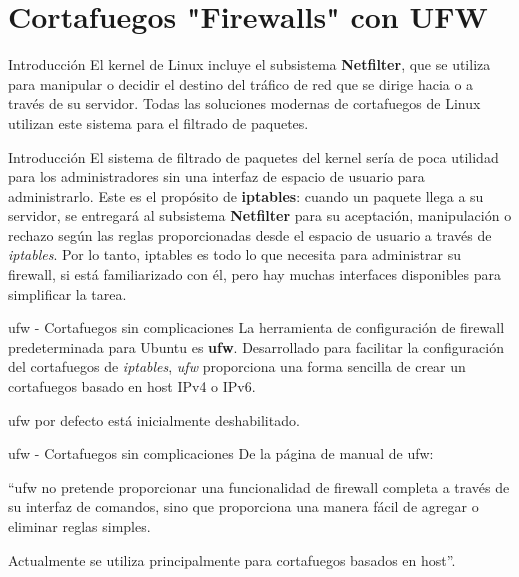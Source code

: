 
\section{Cortafuegos "Firewalls" con UFW}

\begin{frame}[c]{Introducción}
  El kernel de Linux incluye el subsistema \textbf{Netfilter}, que se
  utiliza para manipular o decidir el destino del tráfico de red que se
  dirige hacia o a través de su servidor. Todas las soluciones modernas
  de cortafuegos de Linux utilizan este sistema para el filtrado de paquetes.
\end{frame}

\begin{frame}[c]{Introducción}
  El sistema de filtrado de paquetes del kernel sería de poca utilidad para
  los administradores sin una interfaz de espacio de usuario para
  administrarlo. Este es el propósito de \textbf{iptables}: cuando un paquete
  llega a su servidor, se entregará al subsistema \textbf{Netfilter} para su
  aceptación, manipulación o rechazo según las reglas proporcionadas desde
  el espacio de usuario a través de \emph{iptables}. Por lo tanto, iptables
  es todo lo que necesita para administrar su firewall, si está familiarizado
  con él, pero hay muchas interfaces disponibles para simplificar la tarea.
\end{frame}

\begin{frame}[c]{ufw - Cortafuegos sin complicaciones}
  La herramienta de configuración de firewall predeterminada para Ubuntu es
  \textbf{ufw}. Desarrollado para facilitar la configuración del cortafuegos
  de \emph{iptables}, \emph{ufw} proporciona una forma sencilla de crear un
  cortafuegos basado en host IPv4 o IPv6.

  \vspace{\baselineskip}
  \begin{exampleblock}{ufw}
    por defecto está inicialmente deshabilitado.
  \end{exampleblock}
\end{frame}

\begin{frame}[c]{ufw - Cortafuegos sin complicaciones}
  De la página de manual de ufw:

  \vspace{\baselineskip}
  “ufw no pretende proporcionar una funcionalidad de firewall completa a
  través de su interfaz de comandos, sino que proporciona una manera fácil
  de agregar o eliminar reglas simples.

  \vspace{\baselineskip}
  Actualmente se utiliza principalmente para cortafuegos basados en host”.
\end{frame}

